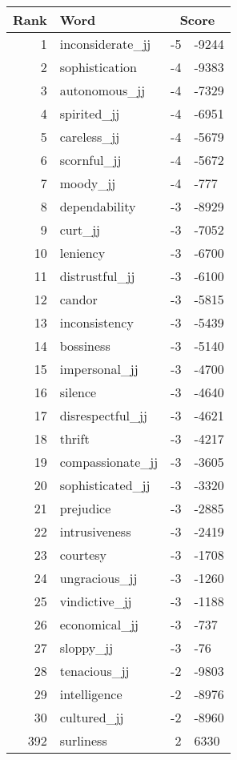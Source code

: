 \begin{longtable}[!htbp]{| rlr@{.}l |}
    \hline
    \textbf{Rank} & \textbf{Word} & \multicolumn{2}{c|}{\textbf{Score}} \\
    \hline
    \endhead
    1 & inconsiderate\_jj & -5 & -9244 \\
    2 & sophistication & -4 & -9383 \\
    3 & autonomous\_jj & -4 & -7329 \\
    4 & spirited\_jj & -4 & -6951 \\
    5 & careless\_jj & -4 & -5679 \\
    6 & scornful\_jj & -4 & -5672 \\
    7 & moody\_jj & -4 & -777 \\
    8 & dependability & -3 & -8929 \\
    9 & curt\_jj & -3 & -7052 \\
    10 & leniency & -3 & -6700 \\
    11 & distrustful\_jj & -3 & -6100 \\
    12 & candor & -3 & -5815 \\
    13 & inconsistency & -3 & -5439 \\
    14 & bossiness & -3 & -5140 \\
    15 & impersonal\_jj & -3 & -4700 \\
    16 & silence & -3 & -4640 \\
    17 & disrespectful\_jj & -3 & -4621 \\
    18 & thrift & -3 & -4217 \\
    19 & compassionate\_jj & -3 & -3605 \\
    20 & sophisticated\_jj & -3 & -3320 \\
    21 & prejudice & -3 & -2885 \\
    22 & intrusiveness & -3 & -2419 \\
    23 & courtesy & -3 & -1708 \\
    24 & ungracious\_jj & -3 & -1260 \\
    25 & vindictive\_jj & -3 & -1188 \\
    26 & economical\_jj & -3 & -737 \\
    27 & sloppy\_jj & -3 & -76 \\
    28 & tenacious\_jj & -2 & -9803 \\
    29 & intelligence & -2 & -8976 \\
    30 & cultured\_jj & -2 & -8960 \\
    392 & surliness & 2 & 6330 \\

\end{longtable}
